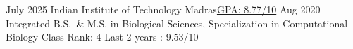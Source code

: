     

\begin{educations}
  \education
    {July 2025}
    {Indian Institute of Technology Madras}{\href{https://drive.google.com/file/d/1mF4nXsZH-vuqLUmqE-SOkOr0GGti4s_I/view?usp=sharing}{GPA: 8.77/10}}
    {Aug 2020}
    {Integrated B.S.\ \& M.S. in Biological Sciences, Specialization in Computational Biology}
    {Class Rank: 4}
    {Last 2 years : 9.53/10}
\end{educations}

\vspace{-3mm}
